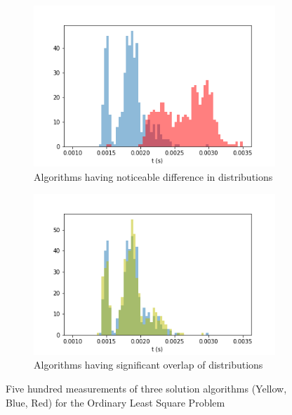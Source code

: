 \documentclass[conference]{IEEEtran}
\begin{document}
\begin{figure}[h!]
	\centering
		\begin{subfigure}[b]{0.5\textwidth}
		\includegraphics[width=1\linewidth]{fig/dif.png}
		\caption{Algorithms having noticeable difference in distributions}
		\label{fig:diff} 
	\end{subfigure}

	\begin{subfigure}[b]{0.5\textwidth}
		\includegraphics[width=1\linewidth]{fig/eq.png}
		\caption{Algorithms having significant overlap of distributions}
		\label{fig:eq}
	\end{subfigure}
	
	\caption{Five hundred measurements of three solution algorithms (Yellow, Blue, Red) for the Ordinary Least Square Problem}
	\label{fig:1}
\end{figure}
\end{document}
